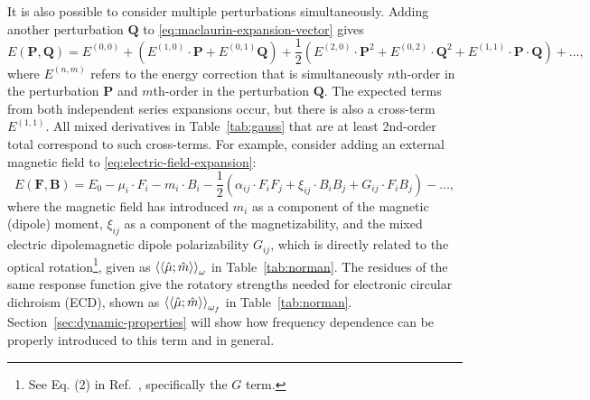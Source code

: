 \documentclass[%
class = book,%
crop = false,%
float = true,%
multi = true,%
preview = false,%
]{standalone}
\begin{document}
It is also possible to consider multiple perturbations simultaneously. Adding another perturbation \(\mathbf{Q}\) to \eqref{eq:maclaurin-expansion-vector} gives
\begin{equation}
  \label{eq:two-perturbation-expansion}
  E(\mathbf{P}, \mathbf{Q}) = E^{(0,0)} + \left(E^{(1,0)} \cdot \mathbf{P} + E^{(0,1)} \mathbf{Q}\right) + \frac{1}{2} \left(E^{(2,0)} \cdot \mathbf{P}^{2} + E^{(0,2)} \cdot \mathbf{Q}^{2} + E^{(1,1)} \cdot \mathbf{P} \cdot \mathbf{Q}\right) + \dots,
\end{equation}
where \(E^{(n,m)}\) refers to the energy correction that is simultaneously \(n\)th-order in the perturbation \(\mathbf{P}\) and \(m\)th-order in the perturbation \(\mathbf{Q}\). The expected terms from both independent series expansions occur, but there is also a cross-term \(E^{(1,1)}\). All mixed derivatives in Table~\ref{tab:gauss} that are at least 2nd-order total correspond to such cross-terms. For example, consider adding an external magnetic field to \eqref{eq:electric-field-expansion}:
\begin{equation}
  \label{eq:electric-and-magnetic-field-expansion}
  E(\mathbf{F}, \mathbf{B}) = E_{0} - \mu_{i} \cdot F_{i} - m_{i} \cdot B_{i} - \frac{1}{2} \left( \alpha_{ij} \cdot F_{i}F_{j} + \xi_{ij} \cdot B_{i}B_{j} + G_{ij} \cdot F_{i}B_{j} \right) - \dots,
\end{equation}
where the magnetic field has introduced \(m_{i}\) as a component of the magnetic (dipole) moment, \(\xi_{ij}\) as a component of the magnetizability, and the mixed electric dipole\textendash{}magnetic dipole polarizability \(G_{ij}\), which is directly related to the optical rotation\footnote{See Eq. (2) in Ref.~\parencite{WCMS:WCMS55}, specifically the \(G\) term.}, given as \(\braket{\braket{\hat{\mu};\hat{m}}}_{\omega}\) in Table~\ref{tab:norman}. The residues of the same response function give the rotatory strengths needed for electronic circular dichroism (ECD), shown as \(\braket{\braket{\hat{\mu};\hat{m}}}_{\omega_{f}}\) in Table~\ref{tab:norman}. Section~\ref{sec:dynamic-properties} will show how frequency dependence can be properly introduced to this term and in general.

\end{document}
